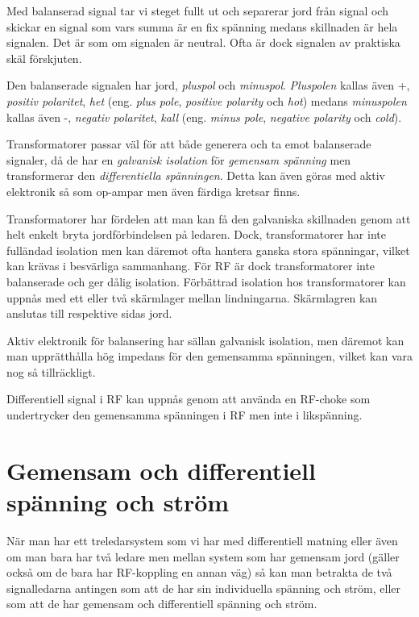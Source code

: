 Med balanserad signal tar vi steget fullt ut och separerar jord från signal
och skickar en signal som vars summa är en fix spänning medans skillnaden är
hela signalen. Det är som om signalen är neutral. Ofta är dock signalen av
praktiska skäl förskjuten.

Den balanserade signalen har jord, \emph{pluspol} och \emph{minuspol}.
\emph{Pluspolen} kallas även +, \emph{positiv polaritet}, \emph{het} (eng.
\emph{plus pole}, \emph{positive polarity} och \emph{hot}) medans
\emph{minuspolen} kallas även -, \emph{negativ polaritet}, \emph{kall} (eng.
\emph{minus pole}, \emph{negative polarity} och \emph{cold}).

Transformatorer passar väl för att både generera och ta emot balanserade
signaler, då de har en \emph{galvanisk isolation} för \emph{gemensam spänning}
men transformerar den \emph{differentiella spänningen}. Detta kan även göras med
aktiv elektronik så som op-ampar men även färdiga kretsar finns.

Transformatorer har fördelen att man kan få den galvaniska skillnaden genom
att helt enkelt bryta jordförbindelsen på ledaren. Dock, transformatorer har
inte fulländad isolation men kan däremot ofta hantera ganska stora spänningar,
vilket kan krävas i besvärliga sammanhang. För RF är dock transformatorer inte
balanserade och ger dålig isolation. Förbättrad isolation hos transformatorer
kan uppnås med ett eller två skärmlager mellan lindningarna. Skärmlagren kan
anslutas till respektive sidas jord.

Aktiv elektronik för balansering har sällan galvanisk isolation, men däremot
kan man upprätthålla hög impedans för den gemensamma spänningen, vilket kan
vara nog så tillräckligt.

Differentiell signal i RF kan uppnås genom att använda en RF-choke som
undertrycker den gemensamma spänningen i RF men inte i likspänning.

\section[Gemensam och diff]{Gemensam och differentiell spänning och ström}

När man har ett treledarsystem som vi har med differentiell matning eller
även om man bara har två ledare men mellan system som har gemensam jord
(gäller också om de bara har RF-koppling en annan väg) så kan man betrakta
de två signalledarna antingen som att de har sin individuella spänning och
ström, eller som att de har gemensam och differentiell spänning och ström.

